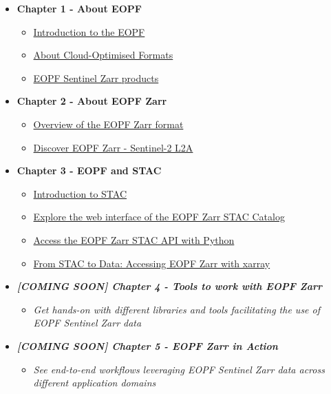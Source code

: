 \documentclass[
  letterpaper,
  DIV=11,
  numbers=noendperiod]{scrreprt}
\providecommand{\tightlist}{%
  \setlength{\itemsep}{0pt}\setlength{\parskip}{0pt}}
\begin{document}
\begin{itemize}
\tightlist
\item
  \textbf{Chapter 1 - About EOPF}

  \begin{itemize}
  \tightlist
  \item
    \href{./11_about_eopf.qmd}{Introduction to the EOPF}
  \item
    \href{./12_about_cloudoptimized_formats.qmd}{About Cloud-Optimised
    Formats}
  \item
    \href{./13_overview_eopf_datasets.qmd}{EOPF Sentinel Zarr products}
  \end{itemize}
\item
  \textbf{Chapter 2 - About EOPF Zarr}

  \begin{itemize}
  \tightlist
  \item
    \href{./21_what_is_zarr.qmd}{Overview of the EOPF Zarr format}
  \item
    \href{./22_zarr_struct_S2L2A.ipynb}{Discover EOPF Zarr - Sentinel-2
    L2A}
  \end{itemize}
\item
  \textbf{Chapter 3 - EOPF and STAC}

  \begin{itemize}
  \tightlist
  \item
    \href{./31_stac_intro.qmd}{Introduction to STAC}
  \item
    \href{./32_eopf_stac_zarr_tutorial.qmd}{Explore the web interface of
    the EOPF Zarr STAC Catalog}
  \item
    \href{./33_eopf_stac_connection.ipynb}{Access the EOPF Zarr STAC API
    with Python}
  \item
    \href{./34_eopf_stac_xarray_tutorial.ipynb}{From STAC to Data:
    Accessing EOPF Zarr with xarray}
  \end{itemize}
\item
  \textbf{\emph{{[}COMING SOON{]} Chapter 4 - Tools to work with EOPF
  Zarr}}

  \begin{itemize}
  \tightlist
  \item
    \emph{Get hands-on with different libraries and tools facilitating
    the use of EOPF Sentinel Zarr data}
  \end{itemize}
\item
  \textbf{\emph{{[}COMING SOON{]} Chapter 5 - EOPF Zarr in Action}}

  \begin{itemize}
  \tightlist
  \item
    \emph{See end-to-end workflows leveraging EOPF Sentinel Zarr data
    across different application domains}
  \end{itemize}
\end{itemize}
\end{document}
